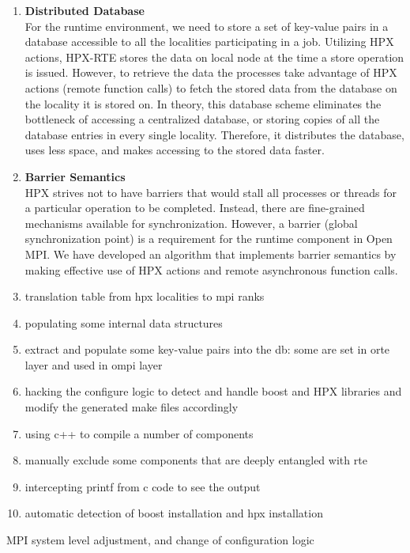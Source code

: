 \begin{enumerate}
\item \textbf{Distributed Database}\\
  For the runtime environment, we need to store a set of key-value pairs in a database accessible to all the localities participating in a job. Utilizing HPX actions, HPX-RTE stores the data on local node at the time a store operation is issued. However, to retrieve the data the processes take advantage of HPX actions (remote function calls) to fetch the stored data from the database on the locality it is stored on. In theory, this database scheme eliminates the bottleneck of accessing a centralized database, or storing copies of all the database entries in every single locality. Therefore, it distributes the database, uses less space, and makes accessing to the stored data faster.
\item \textbf{Barrier Semantics}\\
  HPX strives not to have barriers that would stall all processes or threads for a particular operation to be completed. Instead, there are fine-grained mechanisms available for synchronization. However, a barrier (global synchronization point) is a requirement for the runtime component in Open MPI. We have developed an algorithm that implements barrier semantics by making effective use of HPX actions and remote asynchronous function calls.

  
  \item translation table from hpx localities to mpi ranks
  \item populating some internal data structures
  \item extract and populate some key-value pairs into the db: some are set in orte layer and used in ompi layer
  \item  hacking the configure logic to detect and handle boost and HPX libraries
and modify the generated make files accordingly
  \item using c++ to compile a number of components
  \item manually exclude some components that are deeply entangled with rte
  \item intercepting printf from c code to see the output
  \item automatic detection of boost installation and hpx installation
\end{enumerate}

\iffalse

MPI system level adjustment, and change of configuration logic

